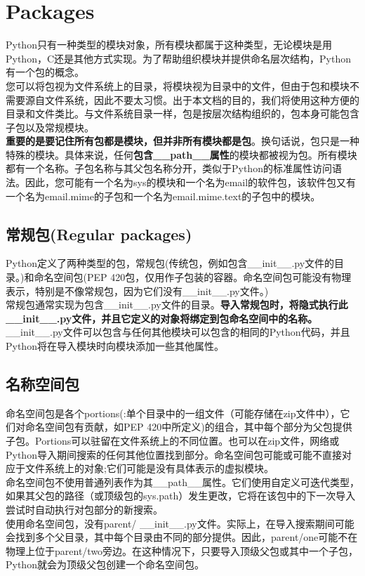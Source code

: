 \documentclass[10pt,UTF8]{ctexart}
\begin{document}
\section{Packages}
Python只有一种类型的模块对象，所有模块都属于这种类型，无论模块是用Python，C还是其他方式实现。为了帮助组织模块并提供命名层次结构，Python有一个包的概念。\\
\indent 您可以将包视为文件系统上的目录，将模块视为目录中的文件，但由于包和模块不需要源自文件系统，因此不要太习惯。出于本文档的目的，我们将使用这种方便的目录和文件类比。与文件系统目录一样，包是按层次结构组织的，包本身可能包含子包以及常规模块。\\
\indent \textbf{重要的是要记住所有包都是模块，但并非所有模块都是包}。换句话说，包只是一种特殊的模块。具体来说，任何\textbf{包含__path__属性}的模块都被视为包。所有模块都有一个名称。子包名称与其父包名称分开，类似于Python的标准属性访问语法。因此，您可能有一个名为sys的模块和一个名为email的软件包，该软件包又有一个名为email.mime的子包和一个名为email.mime.text的子包中的模块。
\subsection{常规包(Regular packages)}
Python定义了两种类型的包，常规包(传统包，例如包含__init__.py文件的目录。)和命名空间包(PEP 420包，仅用作子包装的容器。命名空间包可能没有物理表示，特别是不像常规包，因为它们没有__init__.py文件。)\\
\indent 常规包通常实现为包含__init__.py文件的目录。\textbf{导入常规包时，将隐式执行此__init__.py文件，并且它定义的对象将绑定到包命名空间中的名称。}__init__.py文件可以包含与任何其他模块可以包含的相同的Python代码，并且Python将在导入模块时向模块添加一些其他属性。
\subsection{名称空间包}
命名空间包是各个portions(:单个目录中的一组文件（可能存储在zip文件中），它们对命名空间包有贡献，如PEP 420中所定义)的组合，其中每个部分为父包提供子包。Portions可以驻留在文件系统上的不同位置。也可以在zip文件，网络或Python导入期间搜索的任何其他位置找到部分。命名空间包可能或可能不直接对应于文件系统上的对象;它们可能是没有具体表示的虚拟模块。\\
\indent 命名空间包不使用普通列表作为其__path__属性。它们使用自定义可迭代类型，如果其父包的路径（或顶级包的sys.path）发生更改，它将在该包中的下一次导入尝试时自动执行对包部分的新搜索。\\
\indent 使用命名空间包，没有parent/ __init__.py文件。实际上，在导入搜索期间可能会找到多个父目录，其中每个目录由不同的部分提供。因此，parent/one可能不在物理上位于parent/two旁边。在这种情况下，只要导入顶级父包或其中一个子包，Python就会为顶级父包创建一个命名空间包。
\end{document}
